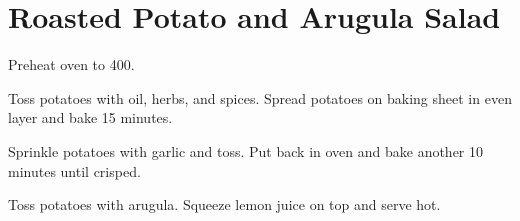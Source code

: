 \section{Roasted Potato and Arugula Salad}
\begin{recipe}



	Preheat oven to 400.

	Toss potatoes with oil, herbs, and spices. Spread potatoes on baking sheet in even layer and bake 15 minutes.

	Sprinkle potatoes with garlic and toss. Put back in oven and bake another 10 minutes until crisped.

	Toss potatoes with arugula. Squeeze lemon juice on top and serve hot.

\end{recipe}
